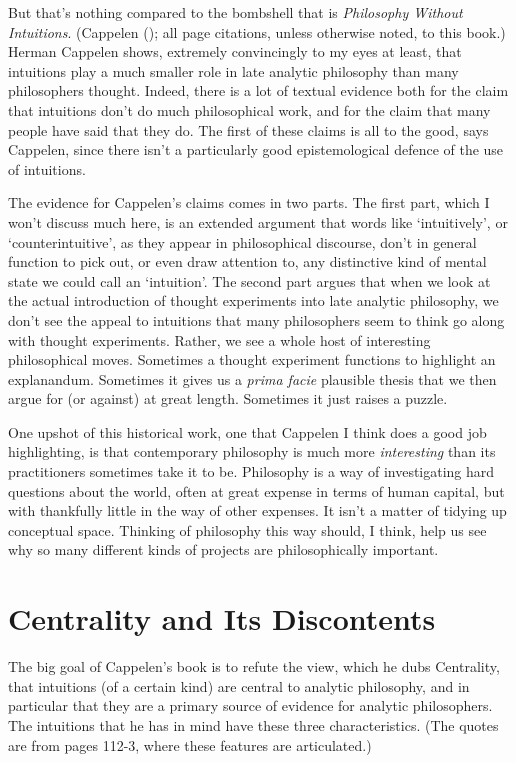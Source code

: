 \documentclass[
  11pt,
  letterpaper,
  DIV=11,
  numbers=noendperiod,
  twoside]{scrartcl}
\begin{document}
But that's nothing compared to the bombshell that is \emph{Philosophy
Without Intuitions}. (Cappelen (); all
page citations, unless otherwise noted, to this book.) Herman Cappelen
shows, extremely convincingly to my eyes at least, that intuitions play
a much smaller role in late analytic philosophy than many philosophers
thought. Indeed, there is a lot of textual evidence both for the claim
that intuitions don't do much philosophical work, and for the claim that
many people have said that they do. The first of these claims is all to
the good, says Cappelen, since there isn't a particularly good
epistemological defence of the use of intuitions.

The evidence for Cappelen's claims comes in two parts. The first part,
which I won't discuss much here, is an extended argument that words like
`intuitively', or `counterintuitive', as they appear in philosophical
discourse, don't in general function to pick out, or even draw attention
to, any distinctive kind of mental state we could call an `intuition'.
The second part argues that when we look at the actual introduction of
thought experiments into late analytic philosophy, we don't see the
appeal to intuitions that many philosophers seem to think go along with
thought experiments. Rather, we see a whole host of interesting
philosophical moves. Sometimes a thought experiment functions to
highlight an explanandum. Sometimes it gives us a \emph{prima facie}
plausible thesis that we then argue for (or against) at great length.
Sometimes it just raises a puzzle.

One upshot of this historical work, one that Cappelen I think does a
good job highlighting, is that contemporary philosophy is much more
\emph{interesting} than its practitioners sometimes take it to be.
Philosophy is a way of investigating hard questions about the world,
often at great expense in terms of human capital, but with thankfully
little in the way of other expenses. It isn't a matter of tidying up
conceptual space. Thinking of philosophy this way should, I think, help
us see why so many different kinds of projects are philosophically
important.

\section{Centrality and Its Discontents}\label{sec-Centrality}

The big goal of Cappelen's book is to refute the view, which he dubs
Centrality, that intuitions (of a certain kind) are central to analytic
philosophy, and in particular that they are a primary source of evidence
for analytic philosophers. The intuitions that he has in mind have these
three characteristics. (The quotes are from pages 112-3, where these
features are articulated.)
\end{document}
